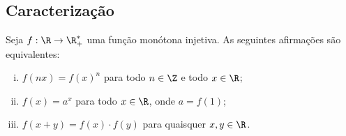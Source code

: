 \subsection{Caracterização}

\begin{theorem}
\label{theo:caracterizacao-funcao-exponencial}
Seja $f: \R \to \R_+^*$ uma função monótona injetiva. As
seguintes afirmações são equivalentes:
\begin{enumerate}[(i)]
  \item $f(nx) = f(x)^n$ para todo $n \in \Z$ e todo $x \in \R$;
  \item $f(x) = a^x$ para todo $x\in \R$, onde $a = f(1)$;
  \item $f(x+y) = f(x)\cdot f(y)$ para quaisquer $x, y \in \R$.
\end{enumerate}
\end{theorem}